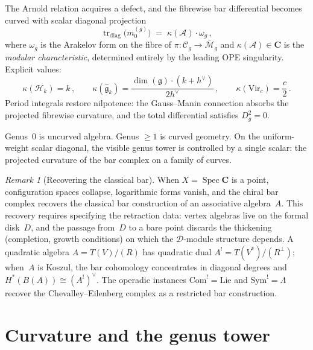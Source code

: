 \documentclass[11pt,reqno]{amsart}
\theoremstyle{definition}
\theoremstyle{remark}
\newtheorem{remark}[theorem]{Remark}
\newcommand{\cA}{\mathcal{A}}
\newcommand{\cH}{\mathcal{H}}
\newcommand{\cM}{\mathcal{M}}
\newcommand{\fg}{\mathfrak{g}}
\newcommand{\Sym}{\mathrm{Sym}}
\newcommand{\Spec}{\operatorname{Spec}}
\newcommand{\Vir}{\mathrm{Vir}}
\renewcommand{\Bbbk}{\mathbf{C}}
\numberwithin{equation}{section}
\begin{document}
The Arnold relation acquires a defect, and the fibrewise bar
differential becomes curved with scalar diagonal projection
\begin{equation}\label{eq:curvature}
\operatorname{tr}_{\mathrm{diag}}\!\bigl(m_0^{(g)}\bigr)
\;=\;
\kappa(\cA) \cdot \omega_g\,,
\end{equation}
where $\omega_g$ is the Arakelov form on the fibre of
$\pi \colon \mathcal{C}_g \to \overline{\cM}_g$ and
$\kappa(\cA) \in \Bbbk$ is the \emph{modular
characteristic}, determined entirely by the leading OPE
singularity. Explicit values:
\begin{equation}\label{eq:kappa-values}
\kappa(\cH_k) = k\,,
\qquad
\kappa(\widehat{\fg}_k)
= \frac{\dim(\fg) \cdot (k + h^\vee)}{2h^\vee}\,,
\qquad
\kappa(\Vir_c)
= \frac{c}{2}\,.
\end{equation}
Period integrals restore nilpotence: the Gauss--Manin
connection absorbs the projected fibrewise curvature, and the total
differential satisfies $D_g^2 = 0$.

Genus~$0$ is uncurved algebra. Genus $\ge 1$ is curved
geometry. On the uniform-weight scalar diagonal, the visible genus
tower is controlled by a single scalar: the projected curvature of the
bar complex on a family of curves.

\begin{remark}[Recovering the classical bar]
\label{rem:classical}
When $X = \Spec\Bbbk$ is a point, configuration spaces
collapse, logarithmic forms vanish, and the chiral bar complex
recovers the classical bar construction of an associative
algebra~$A$. This recovery requires specifying the retraction
data: vertex algebras live on the formal disk~$D$, and the
passage from~$D$ to a bare point discards the thickening
(completion, growth conditions) on which the
$\mathcal{D}$-module structure depends.
A quadratic algebra $A = T(V)/(R)$ has quadratic
dual $A^! = T(V^*)/(R^\perp)$; when~$A$ is Koszul, the bar
cohomology concentrates in diagonal degrees and
$H^*(B(A)) \cong (A^!)^\vee$. The operadic instances
$\mathrm{Com}^! = \mathrm{Lie}$ and
$\Sym^! = \Lambda$ recover the Chevalley--Eilenberg complex
as a restricted bar construction.
\end{remark}


\section{Curvature and the genus tower}
\label{sec:curvature}
\end{document}

